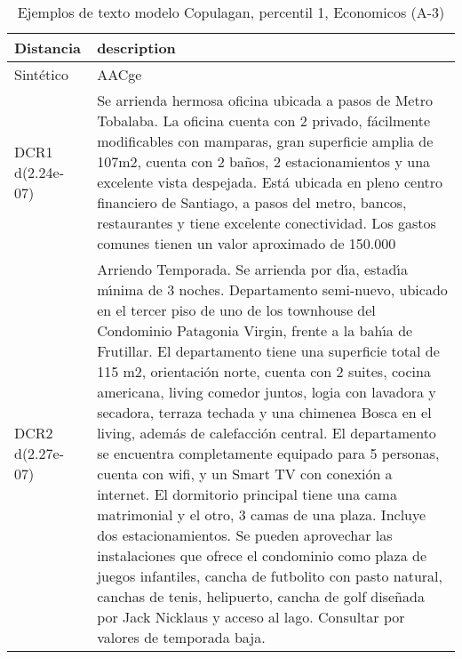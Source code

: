\begin{table}[H]
\centering
\fontsize{10}{14}\selectfont
\caption{Ejemplos de texto modelo Copulagan, percentil 1, Economicos (A-3)}
\label{table-example-economicos-a-3-copulagan-1p-text}
\begin{tabular}{|l|m{35em}|}
\hline
\rowcolor[gray]{0.8}
Distancia & description \\
\hline Sintético & AACge \\
\hline DCR1 d(2.24e-07) & Se arrienda hermosa oficina ubicada a pasos de Metro Tobalaba.  La oficina cuenta con 2 privado, f\'acilmente modificables con mamparas, gran superficie amplia de 107m2, cuenta con 2 ba\~nos, 2 estacionamientos y una excelente vista despejada. Est\'a ubicada en pleno centro financiero de Santiago, a pasos del metro, bancos, restaurantes y tiene excelente conectividad. Los gastos comunes tienen un valor aproximado de 150.000 \\
\hline DCR2 d(2.27e-07) & Arriendo Temporada. Se arrienda por d{\'\i}a, estad{\'\i}a m{\'\i}nima de 3 noches.  Departamento semi-nuevo, ubicado en el tercer piso de uno de los townhouse del Condominio Patagonia Virgin, frente a la bah{\'\i}a de Frutillar.
 El departamento tiene una superficie total de 115 m2, orientaci\'on norte, cuenta con 2 suites, cocina americana, living comedor juntos, logia con lavadora y secadora, terraza techada y una chimenea Bosca en el living, adem\'as de calefacci\'on central. El departamento se encuentra completamente equipado para 5 personas, cuenta con wifi, y un Smart TV con conexi\'on a internet. El dormitorio principal tiene una cama matrimonial y el otro, 3 camas de una plaza.  Incluye dos estacionamientos.  Se pueden aprovechar las instalaciones que ofrece el condominio como plaza de juegos infantiles, cancha de futbolito con pasto natural, canchas de tenis, helipuerto, cancha de golf dise\~nada por Jack Nicklaus y acceso al lago.  Consultar por valores de temporada baja. \\
\hline
\end{tabular}
\end{table}
